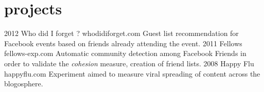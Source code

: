 \documentclass{cv}
\begin{document}
\section{projects}

\begin{entrylist}
  \entry
    {2012}
    {Who did I forget ?}
    {whodidiforget.com}
    {Guest list recommendation for Facebook events based on friends already attending the event.}
  \entry
    {2011}
    {Fellows}
    {fellows-exp.com}
    {Automatic community detection among Facebook Friends in order to validate the \emph{cohesion} measure, creation of friend lists.}
  \entry
    {2008}
    {Happy Flu}
    {happyflu.com}
    {Experiment aimed to measure viral spreading of content across the blogosphere.}
\end{entrylist}
\end{document}
